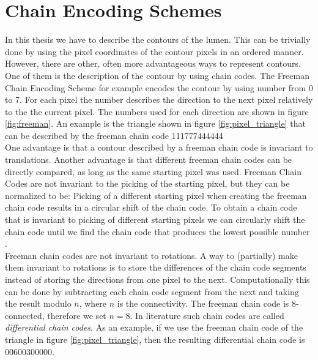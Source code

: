 \documentclass[thesis.tex]{subfiles}
\begin{document}
\section{Chain Encoding Schemes} 
In this thesis we have to describe the contours of the lumen. This can be trivially done by using the pixel coordinates of the contour pixels in an ordered manner. However, there are other, often more advantageous ways to represent contours. One of them is the description of the contour by using chain codes. The Freeman Chain Encoding Scheme \cite{freeman} for example encodes the contour by using number from 0 to 7. For each pixel the number describes the direction to the next pixel relatively to the the current pixel. The numbers used for each direction are shown in figure \ref{fig:freeman}. An example is the triangle shown in figure \ref{fig:pixel_triangle} that can be described by the freeman chain code 111777444444 \\  
One advantage is that a contour described by a freeman chain code is invariant to translations. Another advantage is that different freeman chain codes can be directly compared, as long as the same starting pixel was used. Freeman Chain Codes are not invariant to the picking of the starting pixel, but they can be normalized to be: Picking of a different starting pixel when creating the freeman chain code results in a circular shift of the chain code. To obtain a chain code that is invariant to picking of different starting pixels we can circularly shift the chain code until we find the chain code that produces the lowest possible number \cite{Ballard:1982:CV:578131}. \\  Freeman chain codes are not invariant to rotations. A way to (partially) make them invariant to rotations is to store the differences of the chain code segments instead of storing the directions from one pixel to the next. Computationally this can be done by subtracting each chain code segment from the next and taking the result modulo $n$, where $n$ is the connectivity. The freeman chain code is 8-connected, therefore we set $n = 8$. In literature such chain codes are called \textit{differential chain codes}. As an example, if we use the freeman chain code of the triangle in figure \ref{fig:pixel_triangle}, then the resulting differential chain code is 00600300000.  \\
\end{document}
